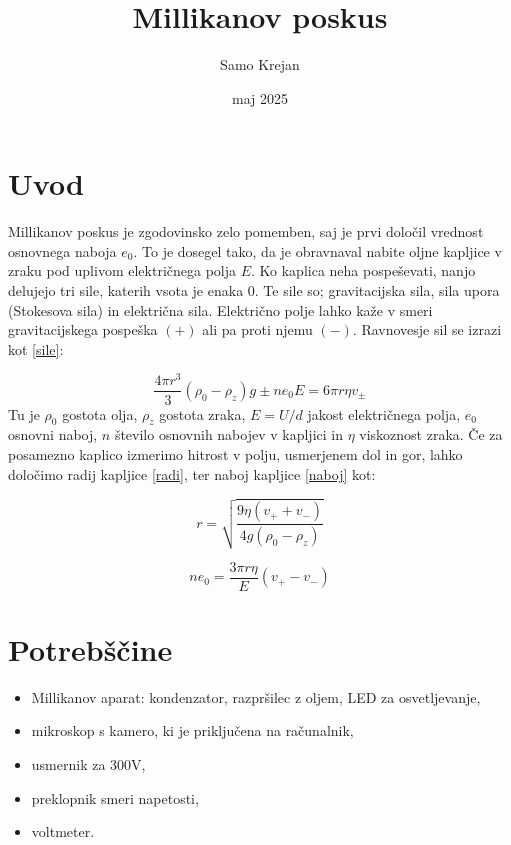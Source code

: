 \documentclass[12pt]{article}
\title{\textbf{Millikanov poskus}}
\author{Samo Krejan}
\date{maj 2025}
\begin{document}
\maketitle

\section{Uvod}

Millikanov poskus je zgodovinsko zelo pomemben, saj je prvi določil vrednost osnovnega naboja $e_0$. To je dosegel tako, da je obravnaval nabite oljne kapljice v zraku pod uplivom električnega polja $E$. Ko kaplica neha pospeševati, nanjo delujejo tri sile, katerih vsota je enaka $0$. Te sile so; gravitacijska sila, sila upora (Stokesova sila) in električna sila. Električno polje lahko kaže v smeri gravitacijskega pospeška $(+)$ ali pa proti njemu $(-).$ Ravnovesje sil se izrazi kot \ref{sile}:

\begin{equation}
    \frac{4\pi r^3}{3} (\rho_0-\rho_z)g \pm n e_0 E = 6\pi r \eta v_\pm
    \label{sile}
\end{equation}
Tu je $\rho_0$ gostota olja, $\rho_z$ gostota zraka, $E = U/d$ jakost električnega polja, $e_0$ osnovni naboj, $n$ število osnovnih nabojev v kapljici in $\eta$ viskoznost zraka. Če za posamezno kaplico izmerimo hitrost v polju, usmerjenem dol in gor, lahko določimo radij kapljice \ref{radi}, ter naboj kapljice \ref{naboj} kot:

\begin{equation}
    r = \sqrt{\frac{9 \eta (v_+ + v_-)}{4g(\rho_0-\rho_z)}}
    \label{radi}
\end{equation}

\begin{equation}
    ne_0 = \frac{3\pi r \eta}{E}(v_+ - v_-)
    \label{naboj}
\end{equation}

\section{Potrebščine}

\begin{itemize}
    \item Millikanov aparat: kondenzator, razpršilec z oljem, LED za osvetljevanje,
    \item mikroskop s kamero, ki je priključena na računalnik,
    \item usmernik za 300V,
    \item preklopnik smeri napetosti,
    \item voltmeter.
\end{itemize}
\end{document}
